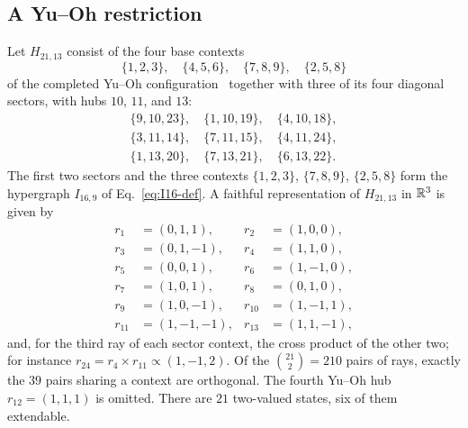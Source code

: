\documentclass[aps,pra,reprint,superscriptaddress,longbibliography,nofootinbib,floatfix,10pt]{revtex4-2}
\theoremstyle{definition}\newtheorem{definition}[theorem]{Definition}
\theoremstyle{remark}\newtheorem{remark}[theorem]{Remark}
\begin{document}
\subsection{A Yu--Oh restriction}\label{sec:H21-rainbow}
Let $H_{21,13}$ consist of the four base contexts
\begin{equation}\label{eq:H21-base}
\{1,2,3\},\quad\{4,5,6\},\quad\{7,8,9\},\quad\{2,5,8\}
\end{equation}
of the completed Yu--Oh configuration~\cite{Yu-2012,svozil-2026-chromaticcoordinatization} together with three of its four diagonal sectors, with hubs $10$, $11$, and $13$:
\begin{equation}\label{eq:H21-sectors}
\begin{gathered}
\{9,10,23\},\quad\{1,10,19\},\quad\{4,10,18\},\\
\{3,11,14\},\quad\{7,11,15\},\quad\{4,11,24\},\\
\{1,13,20\},\quad\{7,13,21\},\quad\{6,13,22\}.
\end{gathered}
\end{equation}
The first two sectors and the three contexts $\{1,2,3\}$, $\{7,8,9\}$, $\{2,5,8\}$ form the hypergraph $I_{16,9}$ of Eq.~\eqref{eq:I16-def}. A faithful representation of $H_{21,13}$ in $\mathbb R^3$ is given by
\begin{equation}\label{eq:YO-rays}
\begin{aligned}
r_1&=(0,1,1),&r_2&=(1,0,0),\\
r_3&=(0,1,-1),&r_4&=(1,1,0),\\
r_5&=(0,0,1),&r_6&=(1,-1,0),\\
r_7&=(1,0,1),&r_8&=(0,1,0),\\
r_9&=(1,0,-1),&r_{10}&=(1,-1,1),\\
r_{11}&=(1,-1,-1),&r_{13}&=(1,1,-1),
\end{aligned}
\end{equation}
and, for the third ray of each sector context, the cross product of the other two; for instance $r_{24}=r_4\times r_{11}\propto(1,-1,2)$. Of the $\binom{21}{2}=210$ pairs of rays, exactly the $39$ pairs sharing a context are orthogonal. The fourth Yu--Oh hub $r_{12}=(1,1,1)$ is omitted. There are $21$ two-valued states, six of them extendable.
\end{document}
